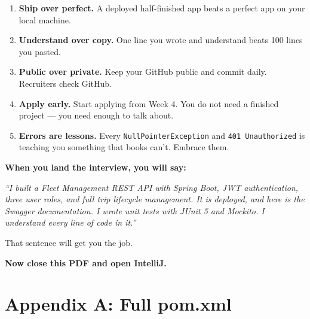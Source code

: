 \documentclass[12pt,a4paper]{report}
\newcommand{\code}[1]{\texttt{\textcolor{keywordblue}{#1}}}
\begin{document}
\begin{enumerate}
  \item \textbf{Ship over perfect.} A deployed half-finished app beats a perfect app on your local machine.
  \item \textbf{Understand over copy.} One line you wrote and understand beats 100 lines you pasted.
  \item \textbf{Public over private.} Keep your GitHub public and commit daily. Recruiters check GitHub.
  \item \textbf{Apply early.} Start applying from Week 4. You do not need a finished project --- you need enough to talk about.
  \item \textbf{Errors are lessons.} Every \code{NullPointerException} and \code{401 Unauthorized} is teaching you something that books can't. Embrace them.
\end{enumerate}

\begin{tcolorbox}[successbox]
\textbf{When you land the interview, you will say:}

\textit{``I built a Fleet Management REST API with Spring Boot, JWT authentication, three user roles, and full trip lifecycle management. It is deployed, and here is the Swagger documentation. I wrote unit tests with JUnit 5 and Mockito. I understand every line of code in it.''}

That sentence will get you the job.

\textbf{Now close this PDF and open IntelliJ.}
\end{tcolorbox}

\appendix
\chapter{Appendix A: Full pom.xml}
\end{document}
